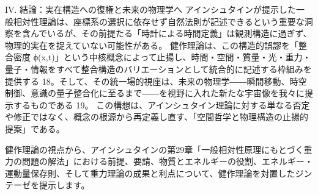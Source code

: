 \documentclass{article}
\begin{document}
IV. 結論：実在構造への復権と未来の物理学へ
アインシュタインが提示した一般相対性理論は、座標系の選択に依存せず自然法則が記述できるという重要な洞察を含んでいるが、その前提たる「時計による時間定義」は観測構造に過ぎず、物理的実在を捉えていない可能性がある。
健作理論は、この構造的誤謬を「整合密度 
ϕ(x,t)」という中核概念によって止揚し、時間・空間・質量・光・重力・量子・情報をすべて整合構造のバリエーションとして統合的に記述する枠組みを提供する 18。そして、その統一場的視座は、未来の物理学――瞬間移動、時空制御、意識の量子整合化に至るまで――を視野に入れた新たな宇宙像を我々に提示するものである 19。
この構想は、アインシュタイン理論に対する単なる否定や修正ではなく、概念の根源から再定義し直す、「空間哲学と物理構造の止揚的提案」である。


健作理論の視点から、アインシュタインの第29章「一般相対性原理にもとづく重力の問題の解法」における前提、要請、物質とエネルギーの役割、エネルギー・運動量保存則、そして重力理論の成果と利点について、健作理論を対置したジンテーゼを提示します。
\end{document}
